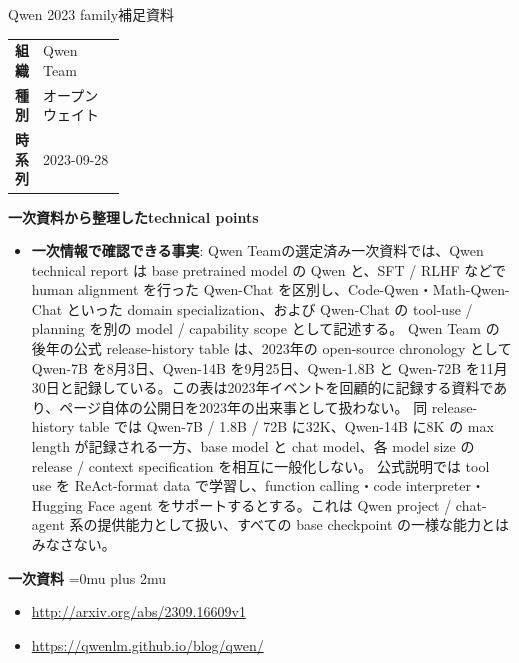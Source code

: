 \begin{technicalnote}{Qwen 2023 family}{補足資料}
\begingroup
\begin{tabularx}{\linewidth}{@{}>{\bfseries}p{0.22\linewidth}X@{}}
組織 & Qwen Team \\
種別 & オープンウェイト \\
時系列 & 2023-09-28 \\
\end{tabularx}
\smallskip
{\bfseries 一次資料から整理したtechnical points}
\begin{itemize}[leftmargin=1.5em,itemsep=0.35em]
\item \textbf{一次情報で確認できる事実}: Qwen Teamの選定済み一次資料では、Qwen technical report は base pretrained model の Qwen と、SFT / RLHF などで human alignment を行った Qwen-Chat を区別し、Code-Qwen・Math-Qwen-Chat といった domain specialization、および Qwen-Chat の tool-use / planning を別の model / capability scope として記述する。 Qwen Team の後年の公式 release-history table は、2023年の open-source chronology として Qwen-7B を8月3日、Qwen-14B を9月25日、Qwen-1.8B と Qwen-72B を11月30日と記録している。この表は2023年イベントを回顧的に記録する資料であり、ページ自体の公開日を2023年の出来事として扱わない。 同 release-history table では Qwen-7B / 1.8B / 72B に32K、Qwen-14B に8K の max length が記録される一方、base model と chat model、各 model size の release / context specification を相互に一般化しない。 公式説明では tool use を ReAct-format data で学習し、function calling・code interpreter・Hugging Face agent をサポートするとする。これは Qwen project / chat-agent 系の提供能力として扱い、すべての base checkpoint の一様な能力とはみなさない。
\end{itemize}
\begin{minipage}{\linewidth}
\begin{samepage}
{\bfseries 一次資料}
\begingroup\sloppy
\Urlmuskip=0mu plus 2mu\relax
\begin{itemize}[leftmargin=1.5em,itemsep=0.25em]
\item {\scriptsize\url{http://arxiv.org/abs/2309.16609v1}}
\item {\scriptsize\url{https://qwenlm.github.io/blog/qwen/}}
\end{itemize}
\endgroup
\end{samepage}
\end{minipage}
\endgroup
\end{technicalnote}
\medskip
